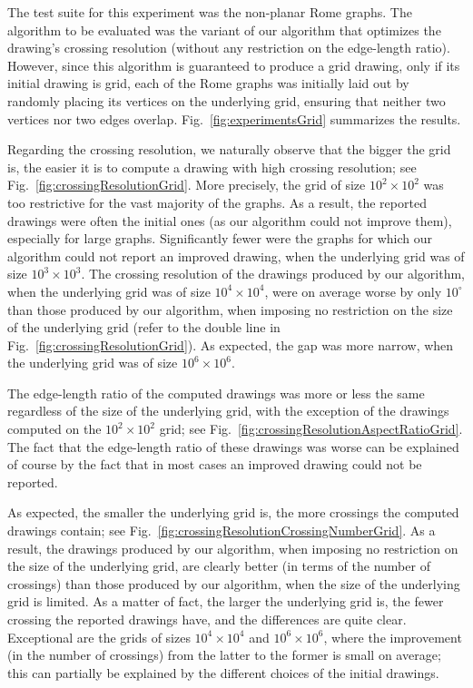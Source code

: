 \documentclass{comjnl}
\begin{document}
The test suite for this experiment was the non-planar Rome graphs. The algorithm to be evaluated was the variant of our algorithm that optimizes the drawing's crossing resolution (without any restriction on the edge-length ratio). However, since this algorithm is guaranteed to produce a grid drawing, only if its initial drawing is grid, each of the Rome graphs was initially laid out by randomly placing its vertices on the underlying grid, ensuring that neither two vertices nor two edges overlap. Fig.~\ref{fig:experimentsGrid} summarizes the results.

Regarding the crossing resolution, we naturally observe that the bigger the grid is, the easier it is to compute a drawing with high crossing resolution; see Fig.~\ref{fig:crossingResolutionGrid}. More precisely, the grid of size $10^2 \times 10^2$ was too restrictive for the vast majority of the graphs. As a result, the reported drawings were often the initial ones (as our algorithm could not improve them), especially for large graphs. Significantly fewer were the graphs for which our algorithm could not report an improved drawing, when the underlying grid was of size $10^3 \times 10^3$. The crossing resolution of the drawings produced by our algorithm, when the underlying grid was of size $10^4 \times 10^4$, were on average worse by only $10^\circ$ than those produced by our algorithm, when imposing no restriction on the size of the underlying grid (refer to the double line in Fig.~\ref{fig:crossingResolutionGrid}). As expected, the gap was more narrow, when the underlying grid was of size $10^6 \times 10^6$.

The edge-length ratio of the computed drawings was more or less the same regardless of the size of the underlying grid, with the exception of the drawings computed on the $10^2 \times 10^2$ grid; see Fig.~\ref{fig:crossingResolutionAspectRatioGrid}. The fact that the edge-length ratio of these drawings was worse can be explained of course by the fact that in most cases an improved drawing could not be reported.

As expected, the smaller the underlying grid is, the more crossings the computed drawings contain; see Fig.~\ref{fig:crossingResolutionCrossingNumberGrid}. As a result, the drawings produced by our algorithm, when imposing no restriction on the size of the underlying grid, are clearly better (in terms of the number of crossings) than those produced by our algorithm, when the size of the underlying grid is limited. As a matter of fact, the larger the underlying grid is, the fewer crossing the reported drawings have, and the differences are quite clear. Exceptional are the grids of sizes $10^4 \times 10^4$ and $10^6 \times 10^6$, where the improvement (in the number of crossings) from the latter to the former is small on average; this can partially be explained by the different choices of the initial drawings.
\end{document}

